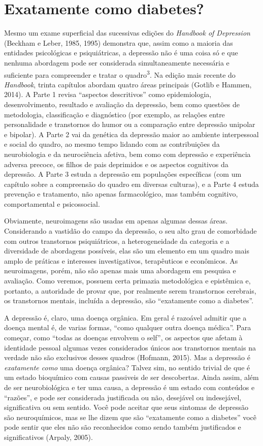 \chapter{Exatamente como diabetes?}

Mesmo um exame superficial das sucessivas edições do \emph{Handbook of
Depression} (Beckham e Leber, 1985, 1995) demonstra que, assim como a
maioria das entidades psicológicas e psiquiátricas, a depressão não é
uma coisa só e que nenhuma abordagem pode ser considerada
simultaneamente necessária e suficiente para compreender e tratar o
quadro\textsuperscript{3}. Na edição mais recente do \emph{Handbook},
trinta capítulos abordam quatro áreas principais (Gotlib e Hammen,
2014). A Parte 1 revisa ``aspectos descritivos'' como epidemiologia,
desenvolvimento, resultado e avaliação da depressão, bem como questões
de metodologia, classificação e diagnóstico (por exemplo, as relações
entre personalidade e transtornos do humor ou a comparação entre
depressão unipolar e bipolar). A Parte 2 vai da genética da depressão
maior ao ambiente interpessoal e social do quadro, ao mesmo tempo
lidando com as contribuições da neurobiologia e da neurociência afetiva,
bem como com depressão e experiência adversa precoce, os filhos de pais
deprimidos e os aspectos cognitivos da depressão. A Parte 3 estuda a
depressão em populações específicas (com um capítulo sobre a compreensão
do quadro em diversas culturas), e a Parte 4 estuda prevenção e
tratamento, não apenas farmacológico, mas também cognitivo,
comportamental e psicossocial.

Obviamente, neuroimagens são usadas em apenas algumas dessas áreas.
Considerando a vastidão do campo da depressão, o seu alto grau de
comorbidade com outros transtornos psiquiátricos, a heterogeneidade da
categoria e a diversidade de abordagens possíveis, elas são um elemento
em um quadro mais amplo de práticas e interesses investigativos,
terapêuticos e econômicos. As neuroimagens, porém, não são apenas mais
uma abordagem em pesquisa e avaliação. Como veremos, possuem certa
primazia metodológica e epistêmica e, portanto, a autoridade de provar
que, por realmente serem transtornos cerebrais, os transtornos mentais,
incluída a depressão, são ``exatamente como a diabetes''.

A depressão é, claro, uma doença orgânica. Em geral é razoável admitir
que a doença mental é, de varias formas, ``como qualquer outra doença
médica''. Para começar, como ``todas as doenças envolvem o self'', os
aspectos que afetam à identidade pessoal algumas vezes considerados
únicos aos transtornos mentais na verdade não são exclusivos desses
quadros (Hofmann, 2015). Mas a depressão é \emph{exatamente como} uma
doença orgânica? Talvez sim, no sentido trivial de que é um estado
bioquímico com causas passiveis de ser descobertas. Ainda assim, além de
ser neurobiológica e ter uma causa, a depressão é um estado com
conteúdos e ``razões'', e pode ser considerada justificada ou não,
desejável ou indesejável, significativa ou sem sentido. Você pode
aceitar que seus sintomas de depressão são neuroquímicos, mas se lhe
dizem que são ``exatamente como a diabetes'' você pode sentir que eles
não são reconhecidos como sendo também justificados e significativos
(Arpaly, 2005).

